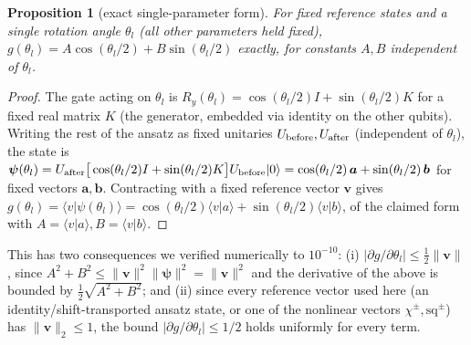 \documentclass[aps,pra,twocolumn,notitlepage,superscriptaddress,floatfix,10pt]{revtex4-2}
\newtheorem{proposition}{Proposition}
\renewcommand{\ket}[1]{\lvert #1 \rangle}
\renewcommand{\braket}[2]{\langle #1 \vert #2 \rangle}
\newcommand{\norm}[1]{\lVert #1 \rVert}
\begin{document}
\begin{proposition}[exact single-parameter form]
For fixed reference states and a single rotation angle $\theta_l$ (all other parameters held fixed),
$g(\theta_l)=A\cos(\theta_l/2)+B\sin(\theta_l/2)$ exactly, for constants $A,B$ independent of
$\theta_l$.
\end{proposition}
\begin{proof}
The gate acting on $\theta_l$ is $R_y(\theta_l)=\cos(\theta_l/2)I+\sin(\theta_l/2)K$ for a fixed
real matrix $K$ (the generator, embedded via identity on the other qubits). Writing the rest of the
ansatz as fixed unitaries $U_{\rm before},U_{\rm after}$ (independent of $\theta_l$), the state is
$\bm\psi(\theta_l)=U_{\rm after}\big[\cos(\theta_l/2)I+\sin(\theta_l/2)K\big]U_{\rm before}\ket{0}
=\cos(\theta_l/2)\,\bm a+\sin(\theta_l/2)\,\bm b$ for fixed vectors $\bm a,\bm b$. Contracting with a
fixed reference vector $\bm v$ gives $g(\theta_l)=\braket{v}{\psi(\theta_l)}
=\cos(\theta_l/2)\braket va+\sin(\theta_l/2)\braket vb$, of the claimed form with
$A=\braket va,B=\braket vb$.
\end{proof}
This has two consequences we verified numerically to $10^{-10}$: (i) $|\partial g/\partial\theta_l|
\le\tfrac12\norm{\bm v}$, since $A^2+B^2\le\norm{\bm v}^2\norm{\bm\psi}^2=\norm{\bm v}^2$ and the
derivative of the above is bounded by $\tfrac12\sqrt{A^2+B^2}$; and (ii) since every reference vector
used here (an identity/shift-transported ansatz state, or one of the nonlinear vectors
$\chi^\pm,\mathrm{sq}^\pm$) has $\norm{\bm v}_2\le1$, the bound $|\partial g/\partial\theta_l|\le1/2$
holds uniformly for every term.
\end{document}
